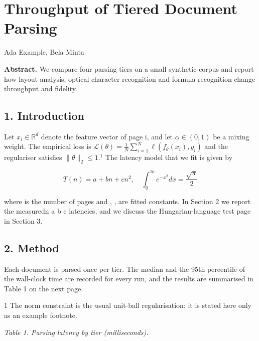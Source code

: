 \documentclass[UTF8,fontset=fandol,11pt]{ctexart}
\begin{document}
\section*{Throughput of Tiered Document Parsing}

Ada Example, Bela Minta\par

\textbf{Abstract.} We compare four parsing tiers on a small synthetic corpus and report how layout analysis, optical character recognition and formula recognition change throughput and fidelity.\par

\subsection*{1. Introduction}

Let \(x_{i}\in\mathbb{R}^{d}\) denote the feature vector of page i, and let \(\alpha \in (0,1)\) be a mixing weight. The empirical loss is \(\mathcal{L}(\theta) = \frac{1}{N}\sum_{i = 1}^{N}\ell (f_{\theta}(x_{i}),y_{i})\) and the regulariser satisfies \(\| \theta \| _2\leq 1.^1\) The latency model that we fit is given by\par

\begin{equation*}
T (n) = a + b n + c n ^ {2}, \quad \int_ {0} ^ {\infty} e ^ {- x ^ {2}} d x = \frac {\sqrt {\pi}}{2}\tag{1}
\end{equation*}

where is the number of pages and , , are fitted constants. In Section 2 we report the measuredn a b c latencies, and we discuss the Hungarian-language test page in Section 3.\par

\subsection*{2. Method}

Each document is parsed once per tier. The median and the 95th percentile of the wall-clock time are recorded for every run, and the results are summarised in Table 1 on the next page.\par

{\footnotesize\color{DocVortexGray} 1 The norm constraint is the usual unit-ball regularisation; it is stated here only as an example footnote.\par}

{\small\itshape Table 1. Parsing latency by tier (milliseconds).\par}
\end{document}
